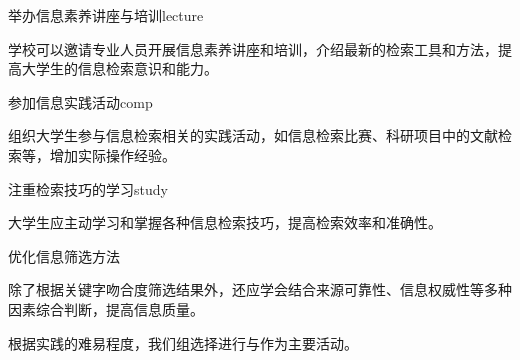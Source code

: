 \begin{ffbox}{举办信息素养讲座与培训}{lecture}

学校可以邀请专业人员开展信息素养讲座和培训，介绍最新的检索工具和方法，提高大学生的信息检索意识和能力。
\end{ffbox}

\begin{ffbox}{参加信息实践活动}{comp}

组织大学生参与信息检索相关的实践活动，如信息检索比赛、科研项目中的文献检索等，增加实际操作经验。
\end{ffbox}

\begin{ffbox}{注重检索技巧的学习}{study}

大学生应主动学习和掌握各种信息检索技巧，提高检索效率和准确性。
\end{ffbox}

\begin{ffbox}{优化信息筛选方法}{}

除了根据关键字吻合度筛选结果外，还应学会结合来源可靠性、信息权威性等多种因素综合判断，提高信息质量。
\end{ffbox}
根据实践的难易程度，我们组选择进行与作为主要活动。